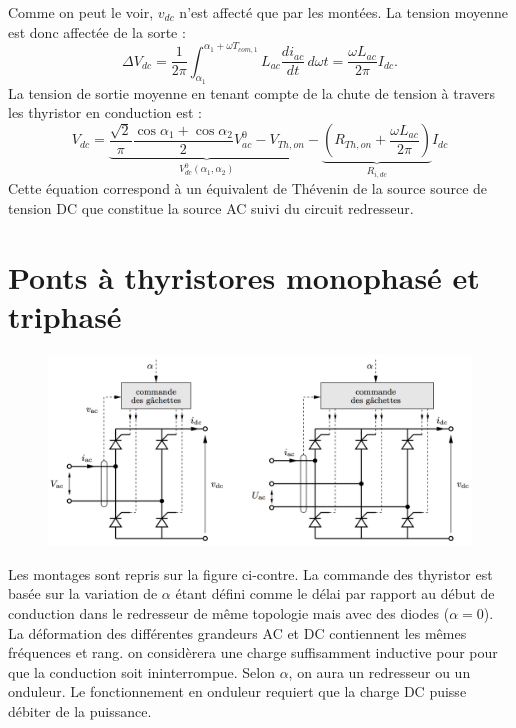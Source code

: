 				Comme on peut le voir, $v_{dc}$ n'est affecté que par les montées. La tension moyenne est donc affectée de la sorte : 
				\begin{equation}
					\Delta V_{dc} = \frac{1}{2\pi} \int _{\alpha _1} ^{\alpha _1 + \omega T_{com,1}} L_{ac} \frac{di_{ac}}{dt} \, d\omega t = \frac{\omega L_{ac}}{2\pi} I_{dc}. 
				\end{equation}
				La tension de sortie moyenne en tenant compte de la chute de tension à travers les thyristor en conduction est :
				\begin{equation}
				V_{dc} = \underbrace{\frac{\sqrt{2}}{\pi} \frac{\cos \alpha _1 + \cos \alpha _2}{2} V_{ac}^0 - V_{Th,on}}_{V_{dc}^0(\alpha _1,\alpha _2)} - \underbrace{\left( R_{Th,on} + \frac{\omega L_{ac}}{2\pi} \right)}_{R_{i,dc}}I_{dc}
				\end{equation}
				Cette équation correspond à un équivalent de Thévenin de la source source de tension DC que constitue la source AC suivi du circuit redresseur. 
				
	\section{Ponts à thyristores monophasé et triphasé}
		\begin{figure}
		\vspace{-5mm}
		\includegraphics[scale=0.3]{ch3/5}
		\end{figure}
		Les montages sont repris sur la figure ci-contre. La commande des thyristor est basée sur la variation de $\alpha$ étant défini comme le délai par rapport au début de conduction dans le redresseur de même topologie mais avec des diodes ($\alpha = 0$). La déformation des différentes grandeurs AC et DC contiennent les mêmes fréquences et rang. on considèrera une charge suffisamment inductive pour pour que la conduction soit ininterrompue. Selon $\alpha$, on aura un redresseur ou un onduleur. Le fonctionnement en onduleur requiert que la charge DC puisse débiter de la puissance. 
		
